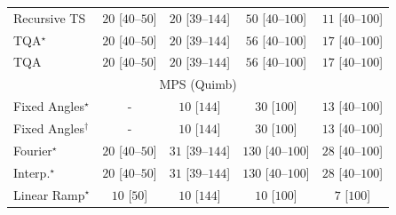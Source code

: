 \begin{tabular}{l|cccc|}
Recursive TS & {\cellcolor[HTML]{F5FBF2}} \color[HTML]{000000} $20$ [$40$--$50$] & {\cellcolor[HTML]{F5FBF2}} \color[HTML]{000000} $20$ [$39$--$144$] & {\cellcolor[HTML]{F0F9EC}} \color[HTML]{000000} $50$ [$40$--$100$] & {\cellcolor[HTML]{F6FCF4}} \color[HTML]{000000} $11$ [$40$--$100$] \\
TQA$^\star$ & {\cellcolor[HTML]{F5FBF2}} \color[HTML]{000000} $20$ [$40$--$50$] & {\cellcolor[HTML]{F5FBF2}} \color[HTML]{000000} $20$ [$39$--$144$] & {\cellcolor[HTML]{EFF9EB}} \color[HTML]{000000} $56$ [$40$--$100$] & {\cellcolor[HTML]{F5FBF3}} \color[HTML]{000000} $17$ [$40$--$100$] \\
TQA & {\cellcolor[HTML]{F5FBF2}} \color[HTML]{000000} $20$ [$40$--$50$] & {\cellcolor[HTML]{F5FBF2}} \color[HTML]{000000} $20$ [$39$--$144$] & {\cellcolor[HTML]{EFF9EB}} \color[HTML]{000000} $56$ [$40$--$100$] & {\cellcolor[HTML]{F5FBF3}} \color[HTML]{000000} $17$ [$40$--$100$] \\
\cline{1-5}
\multicolumn{5}{c}{\rule{0pt}{8pt}MPS (Quimb)} \\
\midrule
Fixed Angles$^\star$ & {\cellcolor[HTML]{000000}} \color[HTML]{F1F1F1} {\cellcolor{white}} \color{black} - & {\cellcolor[HTML]{F7FCF5}} \color[HTML]{000000} $10$ [$144$] & {\cellcolor[HTML]{F3FAF0}} \color[HTML]{000000} $30$ [$100$] & {\cellcolor[HTML]{F6FCF4}} \color[HTML]{000000} $13$ [$40$--$100$] \\
Fixed Angles$^\dagger$ & {\cellcolor[HTML]{000000}} \color[HTML]{F1F1F1} {\cellcolor{white}} \color{black} - & {\cellcolor[HTML]{F7FCF5}} \color[HTML]{000000} $10$ [$144$] & {\cellcolor[HTML]{F3FAF0}} \color[HTML]{000000} $30$ [$100$] & {\cellcolor[HTML]{F6FCF4}} \color[HTML]{000000} $13$ [$40$--$100$] \\
Fourier$^\star$ & {\cellcolor[HTML]{F5FBF2}} \color[HTML]{000000} $20$ [$40$--$50$] & {\cellcolor[HTML]{F3FAF0}} \color[HTML]{000000} $31$ [$39$--$144$] & {\cellcolor[HTML]{DFF3DA}} \color[HTML]{000000} $130$ [$40$--$100$] & {\cellcolor[HTML]{F4FBF1}} \color[HTML]{000000} $28$ [$40$--$100$] \\
Interp.$^\star$ & {\cellcolor[HTML]{F5FBF2}} \color[HTML]{000000} $20$ [$40$--$50$] & {\cellcolor[HTML]{F3FAF0}} \color[HTML]{000000} $31$ [$39$--$144$] & {\cellcolor[HTML]{DFF3DA}} \color[HTML]{000000} $130$ [$40$--$100$] & {\cellcolor[HTML]{F4FBF1}} \color[HTML]{000000} $28$ [$40$--$100$] \\
Linear Ramp$^\star$ & {\cellcolor[HTML]{F7FCF5}} \color[HTML]{000000} $10$ [$50$] & {\cellcolor[HTML]{F7FCF5}} \color[HTML]{000000} $10$ [$144$] & {\cellcolor[HTML]{F7FCF5}} \color[HTML]{000000} $10$ [$100$] & {\cellcolor[HTML]{F7FCF5}} \color[HTML]{000000} $7$ [$100$] \\

\end{tabular}
